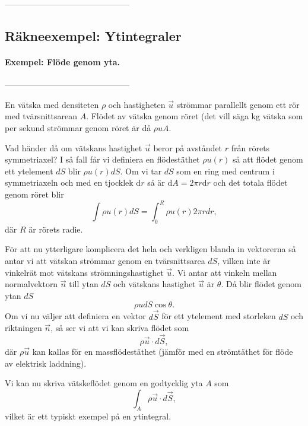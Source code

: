\documentclass[%
oneside,                 %
final,                   %
10pt]{article}
\begin{document}
---------------------------------------------

\subsection{Räkneexempel: Ytintegraler}

\paragraph{Exempel: Flöde genom yta.}
--------------------------------------------- 

En vätska med densiteten $\rho$ och hastigheten $\vec{u}$ strömmar parallellt genom ett rör med tvärsnittsarean $A$.  Flödet av vätska genom röret (det vill säga kg vätska som per sekund strömmar genom röret är då $\rho u A$.  

Vad händer då om vätskans  hastighet $\vec{u}$ beror på avståndet $r$ från rörets symmetriaxel?  I så fall får vi definiera en flödestäthet $\rho u(r)$ så att flödet genom ett ytelement $dS$ blir $\rho u(r)dS$. Om vi tar $dS$ som en ring med centrum i symmetriaxeln och med en tjocklek d$r$ så är d$A = 2\pi r$d$r$ och det totala flödet genom röret blir
\begin{equation}
  \int \rho u( r ) dS = \int_0^R \rho u ( r ) 2 \pi r
dr,
\end{equation}
där $R$ är rörets radie.

För att nu ytterligare komplicera det hela och verkligen blanda in vektorerna så antar vi att vätskan strömmar genom en tvärsnittsarea $dS$, vilken inte är vinkelrät mot vätskans strömningshastighet $\vec{u}$.  Vi antar att vinkeln mellan normalvektorn $\vec{n}$ till ytan $dS$ och vätskans hastighet $\vec{u}$ är $\theta$.  Då blir flödet genom ytan $dS$
\begin{equation}
  \rho u dS \cos \theta.
\end{equation}
Om vi nu väljer att definiera en vektor $d\vec{S}$ för ett ytelement med storleken $dS$ och riktningen $\vec{n}$, så ser vi att vi kan skriva flödet som
\begin{equation}
  \rho \vec{u} \cdot d\vec{S},
\end{equation}
där $\rho \vec{u}$ kan kallas för en massflödestäthet (jämför med en strömtäthet för flöde av elektrisk laddning).

Vi kan nu skriva vätskeflödet genom en godtycklig yta $A$ som
\begin{equation}
  \int_A \rho \vec{u} \cdot d\vec{S},
\end{equation}
vilket är ett typiskt exempel på en ytintegral.
\end{document}
